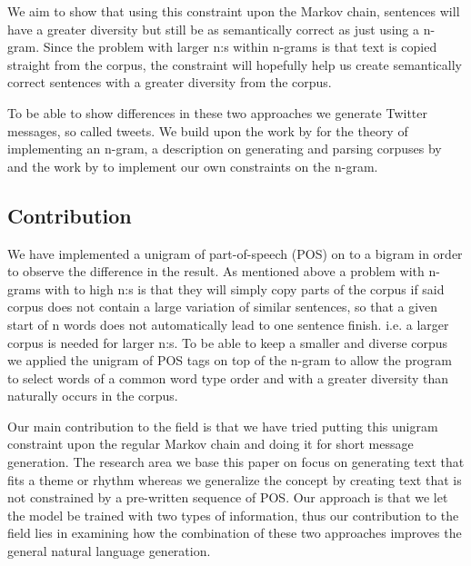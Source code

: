 \documentclass[a4paper,12pt]{article}
\begin{document}
We aim to show that using this constraint upon the Markov chain, sentences will have a greater diversity but still be as semantically correct as just using a n-gram.
Since the problem with larger n:s within n-grams is that text is copied straight from the corpus, 
the constraint will hopefully help us create semantically correct sentences with a greater diversity from the corpus.

To be able to show differences in these two approaches we generate Twitter messages, so called tweets. 
We build upon the work by \cite{shannon48} for the theory of implementing an n-gram, a description on generating and parsing corpuses by \citep{Corpus}
and the work by \citealp{McBarb} to implement our own constraints on the n-gram.
   
\subsection{Contribution}

We have implemented a unigram of part-of-speech (POS) on to a bigram in order to observe the difference in the result. 
As mentioned above a problem with n-grams with to high n:s is that they will simply copy parts of the corpus if said corpus does not contain a large variation of similar sentences, 
so that a given start of n words does not automatically lead to one sentence finish. i.e. a larger corpus is needed for larger n:s.
To be able to keep a smaller and diverse corpus we applied the unigram of POS tags on top of the n-gram to allow the program to select words of a common word type order and with a greater diversity than naturally occurs in the corpus.

Our main contribution to the field is that we have tried putting this unigram constraint upon the regular Markov chain and doing it for short message generation.
The research area we base this paper on focus on generating text that fits a theme or rhythm whereas we generalize the concept by creating text that is not constrained by a pre-written sequence of POS. 
Our approach is that we let the model be trained with two types of information, thus our contribution to the field lies in examining how the combination of these two approaches improves the general natural language generation.


\end{document}

